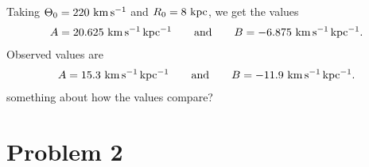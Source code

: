 \documentclass[11pt,letterpaper]{article}
\begin{document}
        Taking $\Theta_0 = 220~{\rm km\,s^{-1}}$ and $R_0 = 8~{\rm kpc}$, we get the values 
        \begin{align*}
            A = 20.625~{\rm km\,s^{-1}\,kpc^{-1}} \qquad \text{and} \qquad B = -6.875~{\rm km\,s^{-1}\,kpc^{-1}}.
        \end{align*}
        Observed values are 
        \begin{align*}
            A = 15.3~{\rm km\,s^{-1}\,kpc^{-1}} \qquad \text{and} \qquad B = -11.9~{\rm km\,s^{-1}\,kpc^{-1}}.
        \end{align*}
        {\huge something about how the values compare?}
            


\section*{Problem 2}
\end{document}
